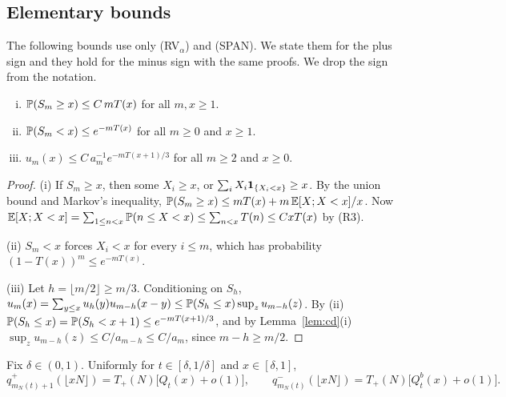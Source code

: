 \subsection{Elementary bounds}\label{sec:elementary}

The following bounds use only (RV$_\alpha$) and (SPAN). We state them for the plus
sign and they hold for the minus sign with the same proofs. We drop the sign from
the notation.

\begin{lemma}\label{lem:sums}
\begin{enumerate}[(i)]
\item $\mathbb{P}(S_m\ge x)\le C\,mT(x)$ for all $m,x\ge1$.
\item $\mathbb{P}(S_m<x)\le e^{-mT(x)}$ for all $m\ge0$ and $x\ge1$.
\item $u_m(x)\le C\,a_m^{-1}e^{-mT(x+1)/3}$ for all $m\ge2$ and $x\ge0$.
\end{enumerate}
\end{lemma}

\begin{proof}
(i) If $S_m\ge x$, then some $X_i\ge x$, or $\sum_iX_i\mathbf{1}_{\{X_i<x\}}\ge x$. By the
union bound and Markov's inequality,
$\mathbb{P}(S_m\ge x)\le mT(x)+m\,\mathbb{E}[X;X<x]/x$. Now
$\mathbb{E}[X;X<x]=\sum_{1\le n<x}\mathbb{P}(n\le X<x)\le\sum_{n<x}T(n)\le CxT(x)$ by (R3).

(ii) $S_m<x$ forces $X_i<x$ for every $i\le m$, which has probability
$(1-T(x))^m\le e^{-mT(x)}$.

(iii) Let $h=\lfloor m/2\rfloor\ge m/3$. Conditioning on $S_h$,
$u_m(x)=\sum_{y\le x}u_h(y)u_{m-h}(x-y)\le\mathbb{P}(S_h\le x)\sup_zu_{m-h}(z)$. By (ii)
$\mathbb{P}(S_h\le x)=\mathbb{P}(S_h<x+1)\le e^{-mT(x+1)/3}$, and by Lemma~\ref{lem:cd}(i)
$\sup_zu_{m-h}(z)\le C/a_{m-h}\le C/a_m$, since $m-h\ge m/2$.
\end{proof}

\begin{lemma}\label{lem:kernel-limit}
Fix $\delta\in(0,1)$. Uniformly for $t\in[\delta,1/\delta]$ and $x\in[\delta,1]$,
\[
 q^\plus_{m_N(t)+1}(\lfloor xN\rfloor)=T_\plus(N)\bigl[Q_t(x)+o(1)\bigr],\qquad
 q^\minus_{m_N(t)}(\lfloor xN\rfloor)=T_\plus(N)\bigl[Q^b_t(x)+o(1)\bigr].
\]
\end{lemma}

